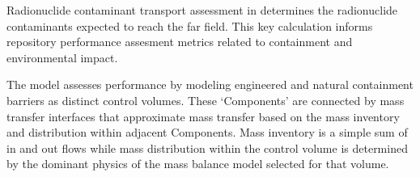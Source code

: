 Radionuclide contaminant transport assessment in \Cyder determines the 
radionuclide contaminants expected to reach the far field. This key calculation 
informs repository performance assesment metrics related to containment and 
environmental impact.

The \Cyder model assesses performance by modeling engineered and natural 
containment barriers as distinct control volumes. These `Components' are 
connected by mass transfer interfaces that approximate mass transfer based on 
the mass inventory and distribution within adjacent Components. Mass inventory 
is a simple sum of in and out flows while mass distribution within the control 
volume is determined by the dominant physics of the mass balance model selected 
for that volume.  
